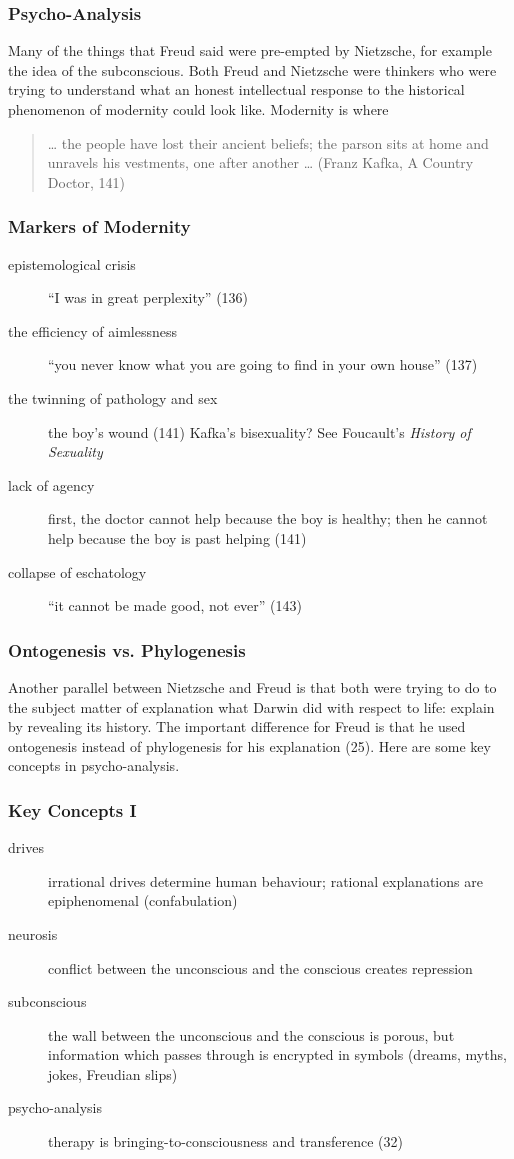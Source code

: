 \documentclass[xcolor=dvipsnames]{beamer}
\begin{document}
\begin{frame}
  \frametitle{Psycho-Analysis} 
  Many of the things that Freud said were pre-empted by Nietzsche, for
  example the idea of the subconscious. Both Freud and Nietzsche were
  thinkers who were trying to understand what an honest intellectual
  response to the historical phenomenon of modernity could look like.
  Modernity is where
\begin{quote}
  {\ldots} the people have lost their ancient beliefs; the parson sits
  at home and unravels his vestments, one after another {\ldots}
  (Franz Kafka, A Country Doctor, 141)
\end{quote}
\end{frame}

\begin{frame}
  \frametitle{Markers of Modernity} 
  \begin{description}
  \item[epistemological crisis] ``I was in great perplexity'' (136)
  \item[the efficiency of aimlessness] ``you never know what you are
    going to find in your own house'' (137)
  \item[the twinning of pathology and sex] the boy's wound (141)
    Kafka's bisexuality? See Foucault's \emph{History of Sexuality}
  \item[lack of agency] first, the doctor cannot help because the boy
    is healthy; then he cannot help because the boy is past helping (141)
  \item[collapse of eschatology] ``it cannot be made good, not ever''
    (143)
  \end{description}
\end{frame}

\begin{frame}
  \frametitle{Ontogenesis vs. Phylogenesis} Another parallel between
  Nietzsche and Freud is that both were trying to do to the subject
  matter of explanation what Darwin did with respect to life: explain
  by revealing its history. The important difference for Freud is that
  he used \alert{ontogenesis} instead of \alert{phylogenesis} for his
  explanation (25). Here are some key concepts in psycho-analysis.
\end{frame}

\begin{frame}
  \frametitle{Key Concepts I} 
  \begin{description}
  \item[drives] irrational drives determine human behaviour; rational
    explanations are epiphenomenal (confabulation)
  \item[neurosis] conflict between the unconscious and the conscious
    creates repression
  \item[subconscious] the wall between the unconscious and the
    conscious is porous, but information which passes through is
    encrypted in symbols (dreams, myths, jokes, Freudian slips)
  \item[psycho-analysis] therapy is bringing-to-consciousness and
    transference (32)
  \end{description}
\end{frame}
\end{document}
